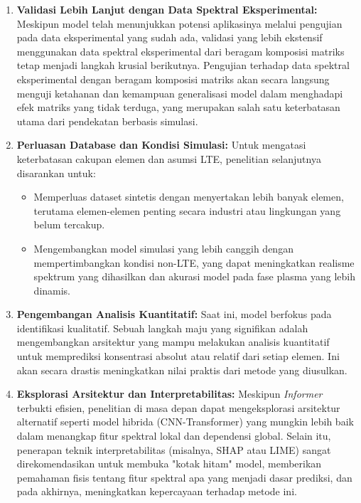 \begin{enumerate}
    \item \textbf{Validasi Lebih Lanjut dengan Data Spektral Eksperimental:} Meskipun model telah menunjukkan potensi aplikasinya melalui pengujian pada data eksperimental yang sudah ada, validasi yang lebih ekstensif menggunakan data spektral eksperimental dari beragam komposisi matriks tetap menjadi langkah krusial berikutnya. Pengujian terhadap data spektral eksperimental dengan beragam komposisi matriks akan secara langsung menguji ketahanan dan kemampuan generalisasi model dalam menghadapi efek matriks yang tidak terduga, yang merupakan salah satu keterbatasan utama dari pendekatan berbasis simulasi.
    \item \textbf{Perluasan Database dan Kondisi Simulasi:} Untuk mengatasi keterbatasan cakupan elemen dan asumsi LTE, penelitian selanjutnya disarankan untuk:
    \begin{itemize}
        \item Memperluas dataset sintetis dengan menyertakan lebih banyak elemen, terutama elemen-elemen penting secara industri atau lingkungan yang belum tercakup.
        \item Mengembangkan model simulasi yang lebih canggih dengan mempertimbangkan kondisi non-LTE, yang dapat meningkatkan realisme spektrum yang dihasilkan dan akurasi model pada fase plasma yang lebih dinamis.
    \end{itemize}
    \item \textbf{Pengembangan Analisis Kuantitatif:} Saat ini, model berfokus pada identifikasi kualitatif. Sebuah langkah maju yang signifikan adalah mengembangkan arsitektur yang mampu melakukan analisis kuantitatif untuk memprediksi konsentrasi absolut atau relatif dari setiap elemen. Ini akan secara drastis meningkatkan nilai praktis dari metode yang diusulkan.
    \item \textbf{Eksplorasi Arsitektur dan Interpretabilitas:} Meskipun \textit{Informer} terbukti efisien, penelitian di masa depan dapat mengeksplorasi arsitektur alternatif seperti model hibrida (CNN-Transformer) yang mungkin lebih baik dalam menangkap fitur spektral lokal dan dependensi global. Selain itu, penerapan teknik interpretabilitas (misalnya, SHAP atau LIME) sangat direkomendasikan untuk membuka "kotak hitam" model, memberikan pemahaman fisis tentang fitur spektral apa yang menjadi dasar prediksi, dan pada akhirnya, meningkatkan kepercayaan terhadap metode ini.
\end{enumerate}
